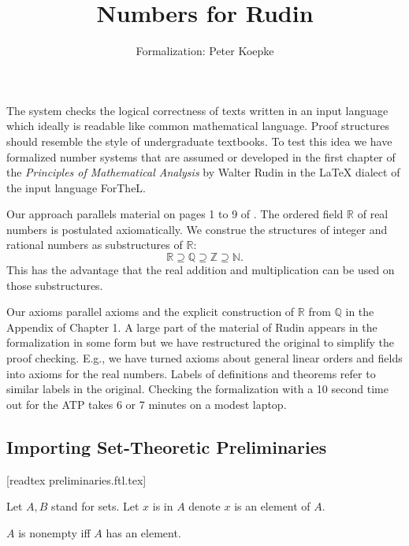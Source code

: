 \documentclass{article}
\begin{document}
\title{Numbers for Rudin}

\author{\Naproche{} Formalization: Peter Koepke}

\maketitle

The \Naproche{} system checks the logical correctness of texts 
written in an input language which ideally is readable 
like common mathematical language. Proof structures should resemble the 
style of undergraduate textbooks. To test this 
idea we have formalized number systems that are
assumed or developed in the first chapter of the 
{\it Principles of Mathematical Analysis} by Walter Rudin 
\cite{Rudin} in the {\LaTeX} dialect of the input language ForTheL.

Our approach parallels material 
on pages 1 to 9 of \cite{Rudin}. 
The ordered field $\mathbb{R}$ of real numbers 
is postulated axiomatically. We construe the structures of integer and 
rational numbers as substructures of $\mathbb{R}$:
$$\mathbb{R} \supseteq \mathbb{Q} \supseteq \mathbb{Z} 
\supseteq \mathbb{N}.$$
This has the advantage that the real addition and multiplication 
can be used on those substructures. 

Our axioms parallel axioms and the explicit construction of 
$\mathbb{R}$ from $\mathbb{Q}$ in the Appendix of Chapter 1.
A large part of the 
material of Rudin appears in the formalization in some form but 
we have restructured the original to simplify the proof 
checking. E.g., we have turned axioms about general 
linear orders and fields into axioms for the real numbers. 
Labels of definitions and theorems
refer to similar labels in the original.
Checking the formalization 
with a 10 second time out for the ATP
takes 6 or 7 minutes on a modest laptop.

\subsection{Importing Set-Theoretic Preliminaries}
\begin{forthel}
[timelimit 10]

[readtex preliminaries.ftl.tex]

Let $A,B$ stand for sets.
Let $x$ is in $A$ denote $x$ is an element of $A$.


\begin{definition}[1 3] $A$ is nonempty iff $A$ has an element.
\end{definition}

\end{forthel}
\end{document}
